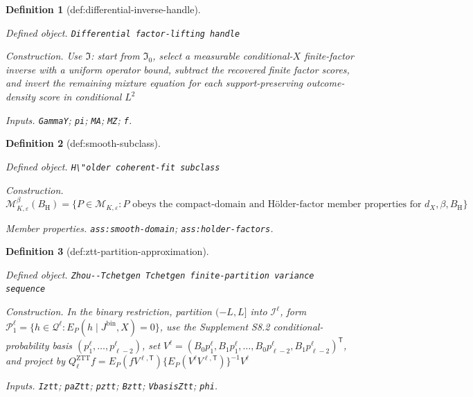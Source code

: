 \documentclass{article}
\newtheorem{definition}{Definition}
\begin{document}
\begin{definition}[def:differential-inverse-handle]\label{def:differential-inverse-handle}
\par\smallskip\noindent\emph{Defined object.} \texttt{Differential factor-\allowbreak{}lifting handle}
\par\smallskip\noindent\emph{Construction.} Use \(\mathfrak I\): start from \(\mathfrak I_0\), select a measurable conditional-\(X\) finite-factor inverse with a uniform operator bound, subtract the recovered finite factor scores, and invert the remaining mixture equation for each support-preserving outcome-density score in conditional \(L^{2}\)
\par\smallskip\noindent\emph{Inputs.} \texttt{GammaY}; \texttt{pi}; \texttt{MA}; \texttt{MZ}; \texttt{f}.
\end{definition}

\begin{definition}[def:smooth-subclass]\label{def:smooth-subclass}
\par\smallskip\noindent\emph{Defined object.} \texttt{H\textbackslash{}\allowbreak{}"older coherent-\allowbreak{}fit subclass}
\par\smallskip\noindent\emph{Construction.} \(\mathcal M^{\beta}_{K,\varepsilon}(B_{\mathrm H})=\{P\in\mathcal M_{K,\varepsilon}:P\text{ obeys the compact-domain and H\"older-factor member properties for }d_X,\beta,B_{\mathrm H}\}\)
\par\smallskip\noindent\emph{Member properties.} \texttt{ass:\allowbreak{}smooth-\allowbreak{}domain}; \texttt{ass:\allowbreak{}holder-\allowbreak{}factors}.
\end{definition}

\begin{definition}[def:ztt-partition-approximation]\label{def:ztt-partition-approximation}
\par\smallskip\noindent\emph{Defined object.} \texttt{Zhou-\allowbreak{}-\allowbreak{}Tchetgen Tchetgen finite-\allowbreak{}partition variance sequence}
\par\smallskip\noindent\emph{Construction.} In the binary restriction, partition \((-L,L]\) into \(\mathcal I^{\ell}\), form \(\mathcal P_1^{\ell}=\{h\in\mathcal Q^{\ell}:E_P(h\mid J^{\mathrm{bin}},X)=0\}\), use the Supplement S8.2 conditional-probability basis \((p_1^{\ell},\ldots,p_{\ell-2}^{\ell})\), set \(V^{\ell}=(B_0p_1^{\ell},B_1p_1^{\ell},\ldots,B_0p_{\ell-2}^{\ell},B_1p_{\ell-2}^{\ell})^{\mathsf T}\), and project by \(Q_{\ell}^{\mathrm{ZTT}}f=E_P(fV^{\ell,\mathsf T})\{E_P(V^{\ell}V^{\ell,\mathsf T})\}^{-1}V^{\ell}\)
\par\smallskip\noindent\emph{Inputs.} \texttt{Iztt}; \texttt{paZtt}; \texttt{pztt}; \texttt{Bztt}; \texttt{VbasisZtt}; \texttt{phi}.
\end{definition}
\end{document}
